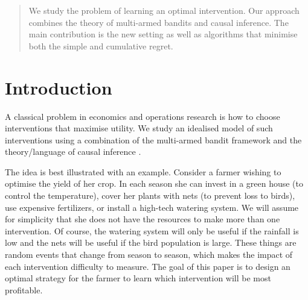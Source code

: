 \documentclass{article}
\newcommand{\tinytodo}[2][]{\todo[size=\tiny]{#2}}
\newcommand{\todot}[2][]{\tinytodo[color=blue!20, #1]{T: #2}} %
\theoremstyle{plain}
\theoremstyle{definition}
\begin{document}
 


\begin{abstract} 
\todot{This can use some work}
We study the problem of learning an optimal intervention. Our approach combines the theory of multi-armed bandits
and causal inference. The main contribution is the new setting as well as algorithms that minimise both the simple and cumulative regret.
\end{abstract} 

\section{Introduction}

A classical problem in economics and operations research is how to choose interventions that maximise utility. 
We study an idealised model of such interventions using a combination of the multi-armed bandit framework \citep{Robbins1952} and the theory/language of causal inference 
\citep{Pearl2000}.

The idea is best illustrated with an example. Consider a farmer wishing to optimise the yield of her crop. In each season she can invest in a green house (to control
the temperature), cover her plants with nets (to prevent loss to birds), use expensive fertilizers, or install a high-tech watering system. We will assume for
simplicity that she does not have the resources to make more than one intervention. Of course, the watering system will only be useful if the rainfall is low and
the nets will be useful if the bird population is large. These things are random events that change from season to season, which makes the impact of each intervention
difficulty to measure. The goal of this paper is to design an optimal strategy for the farmer to learn which intervention will be most profitable.
\end{document}
